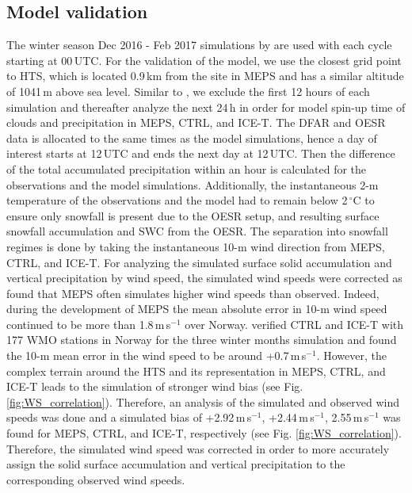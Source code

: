 \documentclass{ametsocV5}
\begin{document}
    \subsection{Model validation}\label{sec:methodology:MEPS_vali}
        The winter season Dec 2016 - Feb 2017 simulations by \citet{engdahl_effects_2020} are used with each cycle starting at 00\,UTC. For the validation of the model, we use the closest grid point to HTS, which is located 0.9\,km from the site in MEPS and has a similar altitude of 1041\,m above sea level. Similar to \citet{engdahl_effects_2020}, we exclude the first 12 hours of each simulation and thereafter analyze the next 24\,h in order for model spin-up time of clouds and precipitation in MEPS, CTRL, and ICE-T. The DFAR and OESR data is allocated to the same times as the model simulations, hence a day of interest starts at 12\,UTC and ends the next day at 12\,UTC. Then the difference of the total accumulated precipitation within an hour is calculated for the observations and the model simulations. 
        Additionally, the instantaneous 2-m temperature of the observations and the model had to remain below 2\,$^{\circ}$C to ensure only snowfall is present due to the OESR setup, and resulting surface snowfall accumulation and SWC from the OESR. The separation into snowfall regimes is done by taking the instantaneous 10-m wind direction from MEPS, CTRL, and ICE-T. For analyzing the simulated surface solid accumulation and vertical precipitation by wind speed, the simulated wind speeds were corrected as \citet{frogner_convection-permitting_2019} found that MEPS often simulates higher wind speeds than observed. Indeed, during the development of MEPS the mean absolute error in 10-m wind speed continued to be more than 1.8\,m\,s$^{-1}$ over Norway. \citet{engdahl_effects_2020} verified CTRL and ICE-T with 177 WMO stations in Norway for the three winter months simulation and found the 10-m mean error in the wind speed to be around +0.7\,m\,s$^{-1}$. However, the complex terrain around the HTS and its representation in MEPS, CTRL, and ICE-T leads to the simulation of stronger wind bias (see Fig. \ref{fig:WS_correlation}). Therefore, an analysis of the simulated and observed wind speeds was done and a simulated bias of +2.92\,m\,s$^{-1}$, +2.44\,m\,s$^{-1}$, 2.55\,m\,s$^{-1}$ was found for MEPS, CTRL, and ICE-T, respectively (see Fig. \ref{fig:WS_correlation}). Therefore, the simulated wind speed was corrected in order to more accurately assign the solid surface accumulation and vertical precipitation to the corresponding observed wind speeds. 
        
\end{document}
